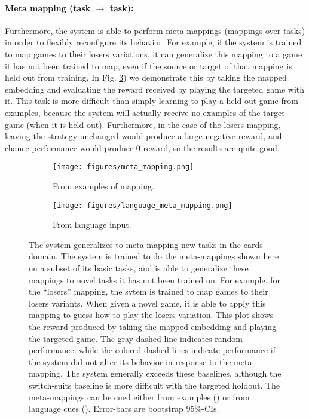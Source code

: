 \documentclass{article}
\begin{document}
\paragraph{Meta mapping (task $\rightarrow$ task):} Furthermore, the system is able to perform meta-mappings (mappings over tasks) in order to flexibly reconfigure its behavior. For example, if the system is trained to map games to their losers variations, it can generalize this mapping to a game it has not been trained to map, even if the source or target of that mapping is held out from training. In Fig. \ref{cards_meta_map_results}) we demonstrate this by taking the mapped embedding and evaluating the reward received by playing the targeted game with it. This task is more difficult than simply learning to play a held out game from examples, because the system will actually receive no examples of the target game (when it is held out). Furthermore, in the case of the losers mapping, leaving the strategy unchanged would produce a large negative reward, and chance performance would produce 0 reward, so the results are quite good. \par
\begin{figure}
\centering
\begin{subfigure}{0.5\textwidth}
\texttt{[image: figures/meta\_mapping.png]}
\caption{From examples of mapping.}
\label{cards_meta_map_results_examples}
\end{subfigure}%
\begin{subfigure}{0.5\textwidth}
\texttt{[image: figures/language\_meta\_mapping.png]}
\caption{From language input.}
\label{cards_meta_map_results_language}
\end{subfigure}
\caption{The system generalizes to meta-mapping new tasks in the cards domain. The system is trained to do the meta-mappings shown here on a subset of its basic tasks, and is able to generalize these mappings to novel tasks it has not been trained on. For example, for the ``losers'' mapping, the sytem is trained to map games to their losers variants. When given a novel game, it is able to apply this mapping to guess how to play the losers variation. This plot shows the reward produced by taking the mapped embedding and playing the targeted game. The gray dashed line indicates random performance, while the colored dashed lines indicate performance if the system did not alter its behavior in response to the meta-mapping. The system generally exceeds these baselines, although the switch-suits baseline is more difficult with the targeted holdout. The meta-mappings can be cued either from examples () or from language cues (). Error-bars are bootstrap 95\%-CIs.}
\label{cards_meta_map_results}
\end{figure}
\end{document}
